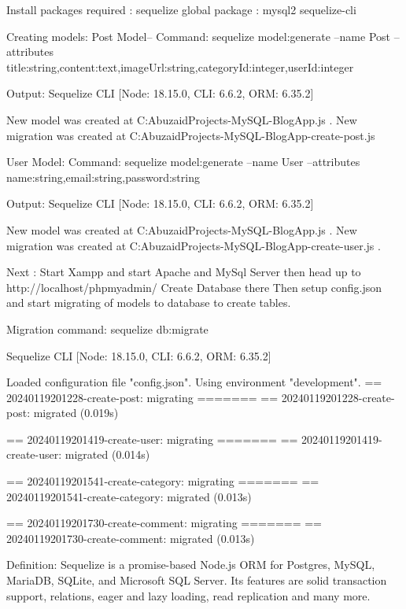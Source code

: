 Install packages required : 
sequelize
global package : mysql2 sequelize-cli

Creating models:
Post Model--
Command: sequelize model:generate --name Post --attributes title:string,content:text,imageUrl:string,categoryId:integer,userId:integer

Output:
Sequelize CLI [Node: 18.15.0, CLI: 6.6.2, ORM: 6.35.2]

New model was created at C:\Users\Mohd Abuzaid\Desktop\Website Projects\Node-MySQL-BlogApp\api\models\post.js .
New migration was created at C:\Users\Mohd Abuzaid\Desktop\Website Projects\Node-MySQL-BlogApp\api\migrations{}-create-post.js

User Model:
Command: sequelize model:generate --name User --attributes name:string,email:string,password:string

Output:
Sequelize CLI [Node: 18.15.0, CLI: 6.6.2, ORM: 6.35.2]

New model was created at C:\Users\Mohd Abuzaid\Desktop\Website Projects\Node-MySQL-BlogApp\api\models\user.js .
New migration was created at C:\Users\Mohd Abuzaid\Desktop\Website Projects\Node-MySQL-BlogApp\api\migrations{}-create-user.js .


Next : Start Xampp and start Apache and MySql Server
then head up to http://localhost/phpmyadmin/
Create Database there
Then setup config.json and start migrating of models to database to create tables.

Migration command:
sequelize db:migrate

Sequelize CLI [Node: 18.15.0, CLI: 6.6.2, ORM: 6.35.2]

Loaded configuration file "config\config.json".
Using environment "development".
== 20240119201228-create-post: migrating =======
== 20240119201228-create-post: migrated (0.019s)

== 20240119201419-create-user: migrating =======
== 20240119201419-create-user: migrated (0.014s)

== 20240119201541-create-category: migrating =======
== 20240119201541-create-category: migrated (0.013s)

== 20240119201730-create-comment: migrating =======
== 20240119201730-create-comment: migrated (0.013s)






Definition:
Sequelize is a promise-based Node.js ORM for Postgres, MySQL, MariaDB, SQLite, and Microsoft SQL Server. Its features are solid transaction support, relations, eager and lazy loading, read replication and many more.

